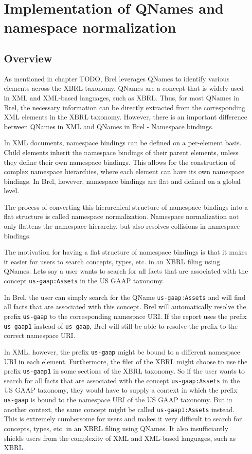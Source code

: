 
\section{Implementation of QNames and namespace normalization}
\label{sec:qnames_implementation}

\subsection{Overview}

As mentioned in chapter TODO, Brel leverages QNames to identify various elements across the XBRL taxonomy. 
QNames are a concept that is widely used in XML and XML-based languages, such as XBRL.
Thus, for most QNames in Brel, the necessary information can be directly extracted from the corresponding XML elements in the XBRL taxonomy.
However, there is an important difference between QNames in XML and QNames in Brel - Namespace bindings.

In XML documents, namespace bindings can be defined on a per-element basis. 
Child elements inherit the namespace bindings of their parent elements, unless they define their own namespace bindings. 
This allows for the construction of complex namespace hierarchies, where each element can have its own namespace bindings.
In Brel, however, namespace bindings are flat and defined on a global level.

The process of converting this hierarchical structure of namespace bindings into a flat structure is called namespace normalization.
Namespace normalization not only flattens the namespace hierarchy, but also resolves collisions in namespace bindings.

The motivation for having a flat structure of namespace bindings is that it makes it easier for users to search concepts, types, etc. in an XBRL filing using QNames.
Lets say a user wants to search for all facts that are associated with the concept \texttt{us-gaap:Assets} in the US GAAP taxonomy.

In Brel, the user can simply search for the QName \texttt{us-gaap:Assets} and will find all facts that are associated with this concept.
Brel will automatically resolve the prefix \texttt{us-gaap} to the corresponding namespace URI.
If the report uses the prefix \texttt{us-gaap1} instead of \texttt{us-gaap}, Brel will still be able to resolve the prefix to the correct namespace URI.

In XML, however, the prefix \texttt{us-gaap} might be bound to a different namespace URI in each element. 
Furthermore, the filer of the XBRL might choose to use the prefix \texttt{us-gaap1} in some sections of the XBRL taxonomy.
So if the user wants to search for all facts that are associated with the concept \texttt{us-gaap:Assets} in the US GAAP taxonomy, 
they would have to supply a context in which the prefix \texttt{us-gaap} is bound to the namespace URI of the US GAAP taxonomy.
But in another context, the same concept might be called \texttt{us-gaap1:Assets} instead.
This is extremely cumbersome for users and makes it very difficult to search for concepts, types, etc. in an XBRL filing using QNames.
It also insufficiantly shields users from the complexity of XML and XML-based languages, such as XBRL.

